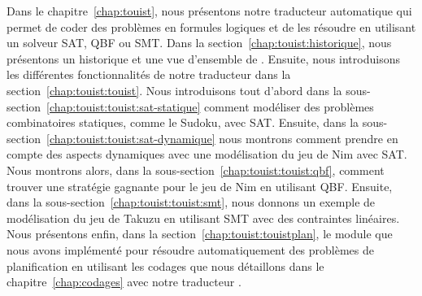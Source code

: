 Dans le chapitre~\ref{chap:touist}, nous présentons notre traducteur automatique \touist qui permet de coder des problèmes en formules logiques et de les résoudre en utilisant un solveur SAT, QBF ou SMT.
Dans la section~\ref{chap:touist:historique}, nous présentons un historique et une vue d'ensemble de \touist. Ensuite, nous introduisons les différentes fonctionnalités de notre traducteur dans la section~\ref{chap:touist:touist}. Nous introduisons tout d'abord dans la sous-section~\ref{chap:touist:touist:sat-statique} comment modéliser des problèmes combinatoires statiques, comme le Sudoku, avec SAT. Ensuite, dans la sous-section~\ref{chap:touist:touist:sat-dynamique} nous montrons comment prendre en compte des aspects dynamiques avec une modélisation du jeu de Nim avec SAT. Nous montrons alors, dans la sous-section~\ref{chap:touist:touist:qbf}, comment trouver une stratégie gagnante pour le jeu de Nim en utilisant QBF. Ensuite, dans la sous-section~\ref{chap:touist:touist:smt}, nous donnons un exemple de modélisation du jeu de Takuzu en utilisant SMT avec des contraintes linéaires.
Nous présentons enfin, dans la section~\ref{chap:touist:touistplan}, le module \touistplan que nous avons implémenté pour résoudre automatiquement des problèmes de planification en utilisant les codages que nous détaillons dans le chapitre~\ref{chap:codages} avec notre traducteur \touist.


